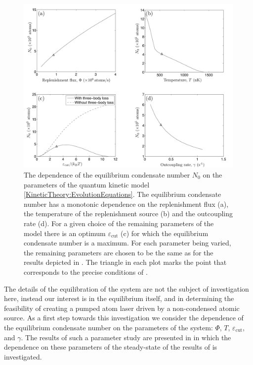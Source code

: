 \begin{figure}
    \centering
    \includegraphics[width=15cm]{ParameterStudies}
    \caption{The dependence of the equilibrium condensate number $N_0$ on the parameters of the quantum kinetic model \eqref{KineticTheory:EvolutionEquations}. The equilibrium condensate number has a monotonic dependence on the replenishment flux (a), the temperature of the replenishment source (b) and the outcoupling rate (d). For a given choice of the remaining parameters of the model there is an optimum $\varepsilon_\text{cut}$ (c) for which the equilibrium condensate number is a maximum. For each parameter being varied, the remaining parameters are chosen to be the same as for the results depicted in . The triangle in each plot marks the point that corresponds to the precise conditions of .}
    \label{KineticTheory:ParameterStudies}
\end{figure}

The details of the equilibration of the system are not the subject of investigation here, instead our interest is in the equilibrium itself, and in determining the feasibility of creating a pumped atom laser driven by a non-condensed atomic source.  As a first step towards this investigation we consider the dependence of the equilibrium condensate number on the parameters of the system: $\Phi$, $T$, $\varepsilon_\text{cut}$, and $\gamma$.  The results of such a parameter study are presented in  in which the dependence on these parameters of the steady-state of the results of  is investigated.


